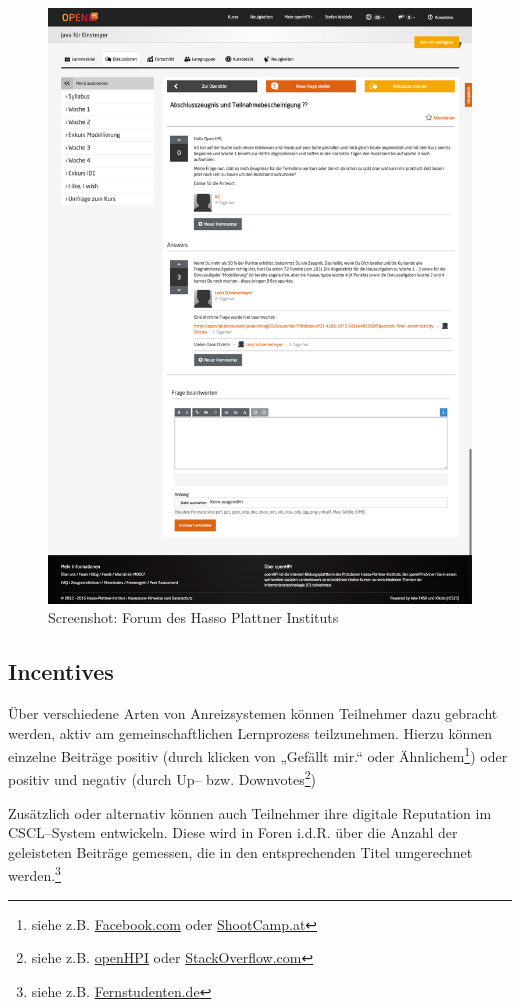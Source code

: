 \begin{figure}[p]
\begin{center}
\includegraphics[width=\textwidth]{hpiforum.png}
\caption{Screenshot: Forum des Hasso Plattner Instituts}
\label{fig:hpi}
\end{center}
\end{figure}

\subsection{Incentives} %
\label{sub:infentives}

Über verschiedene Arten von Anreizsystemen können Teilnehmer dazu gebracht werden, aktiv am gemeinschaftlichen Lernprozess teilzunehmen. Hierzu können einzelne Beiträge positiv (durch klicken von „Gefällt mir.“ oder Ähnlichem\footnote{siehe z.B. \url{Facebook.com} oder \url{ShootCamp.at}}) oder positiv und negativ (durch Up– bzw. Downvotes\footnote{siehe z.B. \url{openHPI} oder \url{StackOverflow.com}})

Zusätzlich oder alternativ können auch Teilnehmer ihre digitale Reputation im \ac{CSCL}–System entwickeln. Diese wird in Foren i.d.R. über die Anzahl der geleisteten Beiträge gemessen, die in den entsprechenden Titel umgerechnet werden.\footnote{siehe z.B. \url{Fernstudenten.de}}

